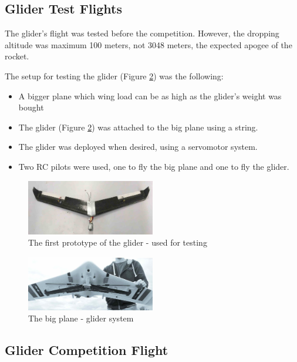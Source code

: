 \subsection{Glider Test Flights}

The glider's flight was tested before the competition. However, the dropping altitude was maximum 100 meters, not 3048 meters, the expected apogee of the rocket.

The setup for testing the glider (Figure \ref{f:prot2}) was the following:
\begin{itemize}
    \item A bigger plane which wing load can be as high as the glider's weight was bought
    \item The glider (Figure \ref{f:prot2}) was attached to the big plane using a string.
    \item The glider was deployed when desired, using a servomotor system.
    \item Two RC pilots were used, one to fly the big plane and one to fly the glider.
\end{itemize}

\begin{figure}[h!]
    \centering
        \includegraphics[width=0.5\textwidth]{img/prototype1.jpg}
        \caption{The first prototype of the glider - used for testing}
        \label{f:prot1}
 \end{figure}


\begin{figure}[h!]
    \centering
        \includegraphics[width=0.5\textwidth]{img/prototype2.jpg}
        \caption{The big plane - glider system}
        \label{f:prot2}
 \end{figure}

\subsection{Glider Competition Flight}

